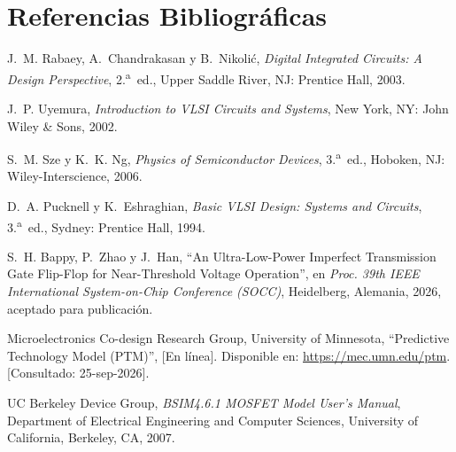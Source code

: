 \section{Referencias Bibliográficas}

\begin{enumerate}[label={[\arabic*]}, leftmargin=1.8em, itemsep=0.5pt, parsep=0pt, topsep=0.5pt]
  \item \label{ref:rabaey} J.~M. Rabaey, A.~Chandrakasan y B.~Nikolić, \emph{Digital Integrated Circuits: A Design Perspective}, 2.\textsuperscript{a}~ed., Upper Saddle River, NJ: Prentice Hall, 2003.
  \item \label{ref:uyemura} J.~P. Uyemura, \emph{Introduction to VLSI Circuits and Systems}, New York, NY: John Wiley \& Sons, 2002.
  \item \label{ref:sze} S.~M. Sze y K.~K. Ng, \emph{Physics of Semiconductor Devices}, 3.\textsuperscript{a}~ed., Hoboken, NJ: Wiley-Interscience, 2006.
  \item \label{ref:pucknell} D.~A. Pucknell y K.~Eshraghian, \emph{Basic VLSI Design: Systems and Circuits}, 3.\textsuperscript{a}~ed., Sydney: Prentice Hall, 1994.
  \item \label{ref:bappy2026} S.~H. Bappy, P.~Zhao y J.~Han, ``An Ultra-Low-Power Imperfect Transmission Gate Flip-Flop for Near-Threshold Voltage Operation'', en \emph{Proc. 39th IEEE International System-on-Chip Conference (SOCC)}, Heidelberg, Alemania, 2026, aceptado para publicación.
  \item \label{ref:ptm} Microelectronics Co-design Research Group, University of Minnesota, ``Predictive Technology Model (PTM)'', [En línea]. Disponible en: \url{https://mec.umn.edu/ptm}. [Consultado: 25-sep-2026].
  \item \label{ref:bsim4} UC Berkeley Device Group, \emph{BSIM4.6.1 MOSFET Model User's Manual}, Department of Electrical Engineering and Computer Sciences, University of California, Berkeley, CA, 2007.
\end{enumerate}
